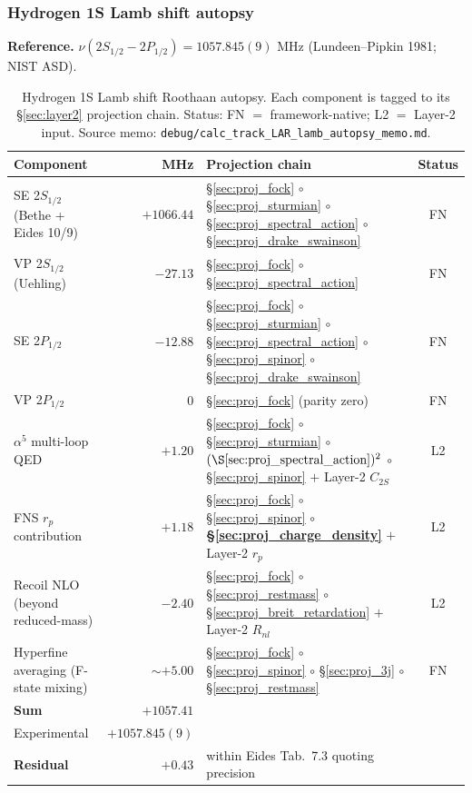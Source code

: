 \documentclass[11pt]{article}
\begin{document}
\subsubsection{Hydrogen 1S Lamb shift autopsy}
\label{sec:autopsy_lamb}

\textbf{Reference.} $\nu(2S_{1/2} - 2P_{1/2}) = 1057.845(9)$ MHz
(Lundeen--Pipkin 1981; NIST ASD).

\begin{table}[h]
\centering\small
\begin{tabular}{p{4cm} r p{6cm} c}
\toprule
Component & MHz & Projection chain & Status \\
\midrule
SE 2$S_{1/2}$ (Bethe + Eides 10/9) & $+1066.44$ &
\S\ref{sec:proj_fock} $\circ$ \S\ref{sec:proj_sturmian} $\circ$
\S\ref{sec:proj_spectral_action} $\circ$ \S\ref{sec:proj_drake_swainson}
& FN \\
VP 2$S_{1/2}$ (Uehling) & $-27.13$ &
\S\ref{sec:proj_fock} $\circ$ \S\ref{sec:proj_spectral_action} & FN \\
SE 2$P_{1/2}$ & $-12.88$ &
\S\ref{sec:proj_fock} $\circ$ \S\ref{sec:proj_sturmian} $\circ$
\S\ref{sec:proj_spectral_action} $\circ$ \S\ref{sec:proj_spinor}
$\circ$ \S\ref{sec:proj_drake_swainson} & FN \\
VP 2$P_{1/2}$ & $0$ &
\S\ref{sec:proj_fock} (parity zero) & FN \\
$\alpha^5$ multi-loop QED & $+1.20$ &
\S\ref{sec:proj_fock} $\circ$ \S\ref{sec:proj_sturmian} $\circ$
$(\S\ref{sec:proj_spectral_action})^2$ $\circ$ \S\ref{sec:proj_spinor}
$+$ Layer-2 $C_{2S}$ & L2 \\
FNS $r_p$ contribution & $+1.18$ &
\S\ref{sec:proj_fock} $\circ$ \S\ref{sec:proj_spinor} $\circ$
\textbf{\S\ref{sec:proj_charge_density}} $+$ Layer-2 $r_p$ & L2 \\
Recoil NLO (beyond reduced-mass) & $-2.40$ &
\S\ref{sec:proj_fock} $\circ$ \S\ref{sec:proj_restmass} $\circ$
\S\ref{sec:proj_breit_retardation} $+$ Layer-2 $R_{nl}$ & L2 \\
Hyperfine averaging (F-state mixing) & $\sim +5.00$ &
\S\ref{sec:proj_fock} $\circ$ \S\ref{sec:proj_spinor} $\circ$
\S\ref{sec:proj_3j} $\circ$ \S\ref{sec:proj_restmass} & FN \\
\midrule
\textbf{Sum} & $+1057.41$ & & \\
Experimental & $+1057.845(9)$ & & \\
\textbf{Residual} & $+0.43$ & within Eides Tab.~7.3 quoting precision & \\
\bottomrule
\end{tabular}
\caption{Hydrogen 1S Lamb shift Roothaan autopsy.  Each component is
tagged to its \S\ref{sec:layer2} projection chain.  Status: FN
$=$ framework-native; L2 $=$ Layer-2 input.  Source memo:
\texttt{debug/calc\_track\_LAR\_lamb\_autopsy\_memo.md}.}
\label{tab:autopsy_lamb}
\end{table}
\end{document}
